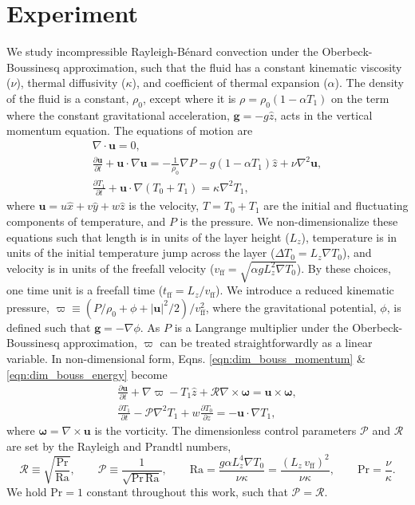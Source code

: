 \documentclass[aps, pre, onecolumn, nofootinbib, notitlepage, groupedaddress, amsfonts, amssymb, amsmath, longbibliography]{revtex4-1}
\newcommand{\DivU}{\ensuremath{\nabla\cdot\bm{u}}}
\newcommand{\grad}{\ensuremath{\nabla}}
\newcommand{\RB}{Rayleigh-B\'{e}nard }
\begin{document}
\section{Experiment}
\label{sec:experiment}
We study incompressible \RB convection under the Oberbeck-Boussinesq approximation,
such that the fluid
has a constant kinematic viscosity ($\nu$), thermal diffusivity ($\kappa$), and coefficient
of thermal expansion ($\alpha$). The density of the fluid is a constant, $\rho_0$,
except where it is $\rho = \rho_0(1  - \alpha T_1)$ on the term where
the constant gravitational acceleration, $\bm{g} = - g\hat{z}$, 
acts in the vertical momentum equation.
The equations of motion are \cite{spiegel&veronis1960}
\begin{gather}
\DivU = 0, 
	\label{eqn:incompressible}
\\
\frac{\partial \bm{u}}{\partial t} + \bm{u}\cdot\grad\bm{u} =
-\frac{1}{\rho_0}\grad P - g( 1 - \alpha T_1)\hat{z} + \nu\grad^2\bm{u}, 
	\label{eqn:dim_bouss_momentum}
\\
\frac{\partial T_1}{\partial t} + \bm{u}\cdot\grad(T_0 + T_1) = \kappa\grad^2 T_1,
	\label{eqn:dim_bouss_energy}
\end{gather}
where $\bm{u} = u\hat{x} + v\hat{y} + w\hat{z}$ is the velocity, 
$T = T_0 + T_1$ are the initial and fluctuating components of temperature, 
and $P$ is the pressure.
We non-dimensionalize these equations such that
length is in units of the layer height ($L_z$),
temperature is in units of the initial temperature jump across the layer ($\Delta T_0 = L_z \grad T_0$), 
and velocity is in units of the freefall velocity ($v_{\text{ff}} = \sqrt{\alpha g L_z^2 \grad T_0}$).
By these choices, one time unit is a freefall time ($t_{\text{ff}} = L_z/v_{\text{ff}}$).
We introduce a reduced kinematic pressure,
$\varpi \equiv (P / \rho_0 + \phi + |\bm{u}|^2 / 2) / v_{\text{ff}}^2$, where the gravitational
potential, $\phi$, is defined such that $\bm{g} = -\grad \phi$. As $P$ is a
Langrange multiplier under the Oberbeck-Boussinesq approximation, $\varpi$
can be treated straightforwardly as a linear variable. 
In non-dimensional form, Eqns. \ref{eqn:dim_bouss_momentum} \& \ref{eqn:dim_bouss_energy}
become
\begin{gather}
\frac{\partial \bm{u}}{\partial t} + \grad \varpi - T_1\hat{z} + \mathcal{R}\grad\times\bm{\omega} = \bm{u}\times\bm{\omega},
	\label{eqn:bouss_momentum}
\\
\frac{\partial T_1}{\partial t} - \mathcal{P}\grad^2 T_1 + w \frac{\partial T_0}{\partial z} = - \bm{u}\cdot\grad T_1,
	\label{eqn:bouss_energy}
\end{gather}
where $\bm{\omega} = \grad \times \bm{u}$ is the vorticity.
The dimensionless control parameters $\mathcal{P}$ and $\mathcal{R}$ 
are set by the Rayleigh and Prandtl numbers,
\begin{equation}
\mathcal{R} \equiv \sqrt{\frac{\text{Pr}}{\text{Ra}}}, \qquad \mathcal{P} \equiv \frac{1}{\sqrt{\text{Pr}\,\text{Ra}}}, \qquad
\text{Ra} = \frac{g \alpha L_z^4 \grad T_0}{\nu\kappa} = \frac{(L_z\,v_{\text{ff}})^2}{\nu\kappa}, \qquad \text{Pr} = \frac{\nu}{\kappa}.
\end{equation}
We hold Pr$ = 1$ constant throughout this work, such that $\mathcal{P} = \mathcal{R}$.
\end{document}

